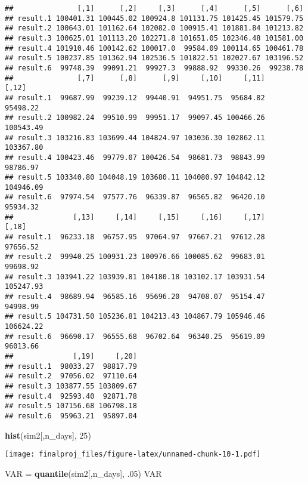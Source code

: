 \documentclass[]{article}
\newenvironment{Shaded}{\begin{snugshade}}{\end{snugshade}}
\newcommand{\DecValTok}[1]{\textcolor[rgb]{0.00,0.00,0.81}{#1}}
\newcommand{\FloatTok}[1]{\textcolor[rgb]{0.00,0.00,0.81}{#1}}
\newcommand{\KeywordTok}[1]{\textcolor[rgb]{0.13,0.29,0.53}{\textbf{#1}}}
\newcommand{\NormalTok}[1]{#1}
\newcommand{\StringTok}[1]{\textcolor[rgb]{0.31,0.60,0.02}{#1}}
\begin{document}
\begin{verbatim}
##               [,1]      [,2]     [,3]      [,4]      [,5]      [,6]
## result.1 100401.31 100445.02 100924.8 101131.75 101425.45 101579.75
## result.2 100643.01 101162.64 102082.0 100915.41 101881.84 101213.82
## result.3 100625.01 101113.20 102271.8 101651.05 102346.48 101581.00
## result.4 101910.46 100142.62 100017.0  99584.09 100114.65 100461.78
## result.5 100237.85 101362.94 102536.5 101822.51 102027.67 103196.52
## result.6  99748.39  99091.21  99927.3  99888.92  99330.26  99238.78
##               [,7]      [,8]      [,9]     [,10]     [,11]     [,12]
## result.1  99687.99  99239.12  99440.91  94951.75  95684.82  95498.22
## result.2 100982.24  99510.99  99951.17  99097.45 100466.26 100543.49
## result.3 103216.83 103699.44 104824.97 103036.30 102862.11 103367.80
## result.4 100423.46  99779.07 100426.54  98681.73  98843.99  98786.97
## result.5 103340.80 104048.19 103680.11 104080.97 104842.12 104946.09
## result.6  97974.54  97577.76  96339.87  96565.82  96420.10  95934.32
##              [,13]     [,14]     [,15]     [,16]     [,17]     [,18]
## result.1  96233.18  96757.95  97064.97  97667.21  97612.28  97656.52
## result.2  99940.25 100931.23 100976.66 100085.62  99683.01  99698.92
## result.3 103941.22 103939.81 104180.18 103102.17 103931.54 105247.93
## result.4  98689.94  96585.16  95696.20  94708.07  95154.47  94998.99
## result.5 104731.50 105236.81 104213.43 104867.79 105946.46 106624.22
## result.6  96690.17  96555.68  96702.64  96340.25  95619.09  96013.66
##              [,19]     [,20]
## result.1  98033.27  98817.79
## result.2  97056.02  97110.64
## result.3 103877.55 103809.67
## result.4  92593.40  92871.78
## result.5 107156.68 106798.18
## result.6  95963.21  95897.04
\end{verbatim}

\begin{Shaded}
\begin{Highlighting}[]
\KeywordTok{hist}\NormalTok{(sim2[,n_days], }\DecValTok{25}\NormalTok{)}
\end{Highlighting}
\end{Shaded}

\texttt{[image: finalproj\_files/figure-latex/unnamed-chunk-10-1.pdf]}

\begin{Shaded}
\begin{Highlighting}[]
\NormalTok{VAR =}\StringTok{ }\KeywordTok{quantile}\NormalTok{(sim2[,n_days], }\FloatTok{.05}\NormalTok{)}
\NormalTok{VAR}
\end{Highlighting}
\end{Shaded}
\end{document}
